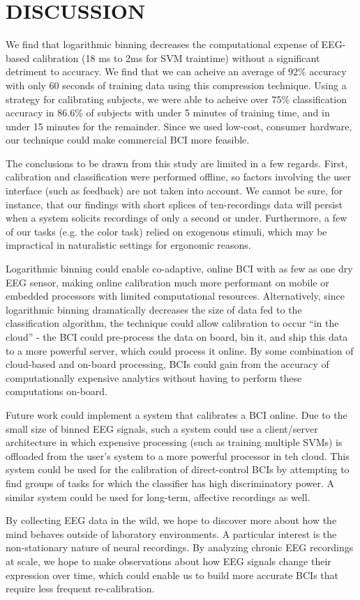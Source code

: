 \section{\uppercase{Discussion}}

\noindent We find that logarithmic binning decreases the computational expense of EEG-based calibration (18 ms to 2ms for SVM traintime) without a significant detriment to accuracy. We find that we can acheive an average of 92\% accuracy with only 60 seconds of training data using this compression technique. Using a strategy for calibrating subjects, we were able to acheive over 75\% classification accuracy in 86.6\% of subjects with under 5 minutes of training time, and in under 15 minutes for the remainder. Since we used low-cost, consumer hardware, our technique could make commercial BCI more feasible.

The conclusions to be drawn from this study are limited in a few regards. First, calibration and classification were performed offline, so factors involving the user interface (such as feedback) are not taken into account. We cannot be sure, for instance, that our findings with short splices of ten-recordings data will persist when a system solicits recordings of only a second or under. Furthermore, a few of our tasks (e.g. the color task) relied on exogenous stimuli, which may be impractical in naturalistic settings for ergonomic reasons. 

Logarithmic binning could enable co-adaptive, online BCI with as few as one dry EEG sensor, making online calibration much more performant on mobile or embedded processors with limited computational resources. Alternatively, since logarithmic binning dramatically decreases the size of data fed to the classification algorithm, the technique could allow calibration to occur “in the cloud” - the BCI could pre-process the data on board, bin it, and ship this data to a more powerful server, which could process it online. By some combination of cloud-based and on-board processing, BCIs could gain from the accuracy of computationally expensive analytics without having to perform these computations on-board.

Future work could implement a system that calibrates a BCI online. Due to the small size of binned EEG signals, such a system could use a client/server architecture in which expensive processing (such as training multiple SVMs) is offloaded from the user’s system to a more powerful processor in teh cloud. This system could be used for the calibration of direct-control BCIs by attempting to find groups of tasks for which the classifier has high discriminatory power. A similar system could be used for long-term, affective recordings as well.

By collecting EEG data in the wild, we hope to discover more about how the mind behaves outside of laboratory environments. A particular interest is the non-stationary nature of neural recordings. By analyzing chronic EEG recordings at scale, we hope to make observations about how EEG signals change their expression over time, which could enable us to build more accurate BCIs that require less frequent re-calibration.
